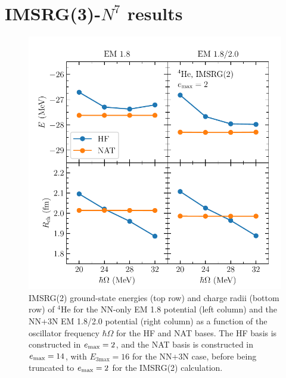 \section{IMSRG(3)-$N^7$ results}

\begin{figure}[t!]
    \begin{center}
        \includegraphics{thesis/doc/images/he4_imsrg2_results}
    \end{center}
    \caption{
        IMSRG(2) ground-state energies (top row) and charge radii (bottom row)
        of ${}^{4}\text{He}$
        for the NN-only EM 1.8 potential (left column)
        and the NN+3N EM 1.8/2.0 potential (right column)
        as a function of the oscillator frequency $\hbar \Omega$
        for the HF and NAT bases.
        The HF basis is constructed in $e_{\text{max}}=2$,
        and the NAT basis is constructed in $e_{\text{max}}=14$,
        with $E_{3\text{max}}=16$ for the NN+3N case,
        before being truncated to $e_{\text{max}}=2$ for the IMSRG(2) calculation.
    }\label{fig:he4_imsrg2_hf_nat}
\end{figure}

